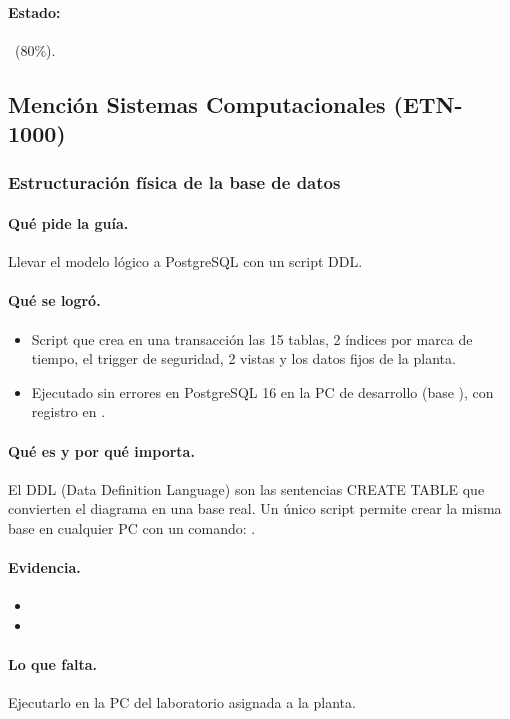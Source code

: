 \documentclass[a4paper,11pt]{article}
\begin{document}
\paragraph{Estado:} \parcial~(80\%).
\subsection{Mención Sistemas Computacionales (ETN-1000)}
\subsubsection{Estructuración física de la base de datos}
\paragraph{Qué pide la guía.} Llevar el modelo lógico a PostgreSQL con un script DDL.
\paragraph{Qué se logró.}
\begin{itemize}
\item Script  que crea en una transacción las 15 tablas, 2 índices por marca de tiempo, el trigger de seguridad, 2 vistas y los datos fijos de la planta.
\item Ejecutado sin errores en PostgreSQL 16 en la PC de desarrollo (base ), con registro en .
\end{itemize}
\paragraph{Qué es y por qué importa.} El DDL (Data Definition Language) son las sentencias CREATE TABLE que convierten el diagrama en una base real. Un único script permite crear la misma base en cualquier PC con un comando: .
\paragraph{Evidencia.}
\begin{itemize}\small
\item {}
\item {}
\end{itemize}
\paragraph{Lo que falta.} Ejecutarlo en la PC del laboratorio asignada a la planta.
\end{document}
